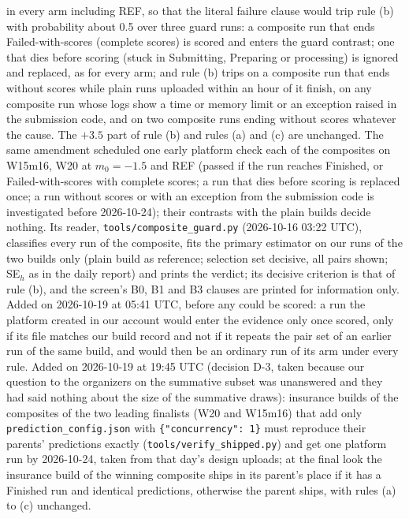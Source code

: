 \documentclass[
]{article}
\begin{document}
in every arm including REF, so that the literal failure clause would
trip rule (b) with probability about 0.5 over three guard runs: a
composite run that ends Failed-with-scores (complete scores) is scored
and enters the guard contrast; one that dies before scoring (stuck in
Submitting, Preparing or processing) is ignored and replaced, as for
every arm; and rule (b) trips on a composite run that ends without
scores while plain runs uploaded within an hour of it finish, on any
composite run whose logs show a time or memory limit or an exception
raised in the submission code, and on two composite runs ending without
scores whatever the cause. The \(+3.5\) part of rule (b) and rules (a)
and (c) are unchanged. The same amendment scheduled one early platform
check each of the composites on W15m16, W20 at \(m_0 = -1.5\) and REF
(passed if the run reaches Finished, or Failed-with-scores with complete
scores; a run that dies before scoring is replaced once; a run without
scores or with an exception from the submission code is investigated
before 2026-10-24); their contrasts with the plain builds decide
nothing. Its reader, \texttt{tools/composite\_guard.py} (2026-10-16
03:22 UTC), classifies every run of the composite, fits the primary
estimator on our runs of the two builds only (plain build as reference;
selection set decisive, all pairs shown; SE\(_h\) as in the daily
report) and prints the verdict; its decisive criterion is that of rule
(b), and the screen's B0, B1 and B3 clauses are printed for information
only. Added on 2026-10-19 at 05:41 UTC, before any could be scored: a
run the platform created in our account would enter the evidence only
once scored, only if its file matches our build record and not if it
repeats the pair set of an earlier run of the same build, and would then
be an ordinary run of its arm under every rule. Added on 2026-10-19 at
19:45 UTC (decision D-3, taken because our question to the organizers on
the summative subset was unanswered and they had said nothing about the
size of the summative draws): insurance builds of the composites of the
two leading finalists (W20 and W15m16) that add only
\texttt{prediction\_config.json} with \texttt{\{"concurrency":\ 1\}}
must reproduce their parents' predictions exactly
(\texttt{tools/verify\_shipped.py}) and get one platform run by
2026-10-24, taken from that day's design uploads; at the final look the
insurance build of the winning composite ships in its parent's place if
it has a Finished run and identical predictions, otherwise the parent
ships, with rules (a) to (c) unchanged.
\end{document}
